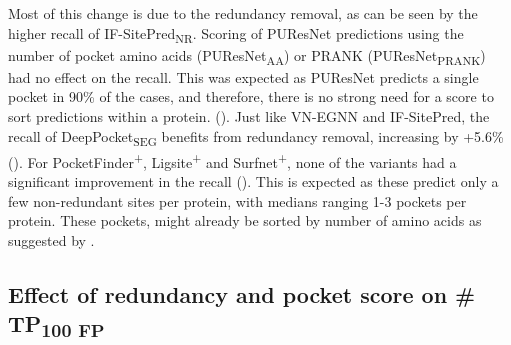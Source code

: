 \noindent
Most of this change is due to the redundancy removal, as can be seen by the higher recall of IF-SitePred\textsubscript{NR}. Scoring of PUResNet predictions using the number of pocket amino acids (PUResNet\textsubscript{AA}) or PRANK (PUResNet\textsubscript{PRANK}) had no effect on the recall. This was expected as PUResNet predicts a single pocket in 90\% of the cases, and therefore, there is no strong need for a score to sort predictions within a protein. (). Just like VN-EGNN and IF-SitePred, the recall of DeepPocket\textsubscript{SEG} benefits from redundancy removal, increasing by +5.6\% (). For PocketFinder\textsuperscript{+}, Ligsite\textsuperscript{+} and Surfnet\textsuperscript{+}, none of the variants had a significant improvement in the recall (). This is expected as these predict only a few non-redundant sites per protein, with medians ranging 1-3 pockets per protein. These pockets, might already be sorted by number of amino acids as suggested by .

\subsection{Effect of redundancy and pocket score on \# TP\textsubscript{100 FP}}

